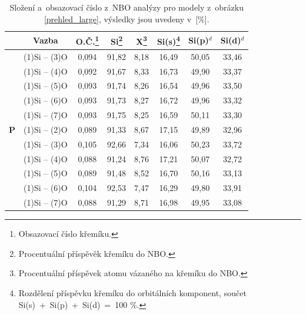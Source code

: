 \documentclass[
digital, %
table,   %
nolof,     %
nolot,     %
oneside,
]{fithesis3}
\begin{document}
\begin{table}[H]
\caption{Složení a~obsazovací číslo z~NBO analýzy pro modely z~obrázku \ref{prehled_large}, výsledky jsou uvedeny v~[\%].}
\begin{minipage}{\textwidth}
\begin{center}
\begin{tabular}{|l|c|c|c|c|c|c|c|}
\hline
\label{nbo_large}&  Vazba & O.Č.\footnote{Obsazovací číslo křemíku.} & Si\footnote{Procentuální příspěvěk křemíku do NBO.} & X\footnote{Procentuální příspěvek atomu vázaného na křemíku do NBO.} & Si(s)\footnote{Rozdělení příspěvku křemíku do orbitálních komponent, součet Si(s)~+~Si(p)~+~Si(d)~=~100 \%.} & Si(p)$^d$ &Si(d)$^d$ \\ \hline
& (1)Si -- (3)O  & 0,094 & 91,82   & 8,18   & 16,49   & 50,05   & 33,46   \\ \hline
&  (1)Si -- (4)O  & 0,092 & 91,67   & 8,33   & 16,73   & 49,90   & 33,37   \\ \hline
& (1)Si -- (5)O & 0,093 & 91,74   & 8,26   & 16,54   & 49,96   & 33,50   \\ \hline
&  (1)Si -- (6)O & 0,093 & 91,73   & 8,27   & 16,72   & 49,96   & 33,32   \\ \hline
& (1)Si -- (7)O& 0,093 & 91,75   & 8,25   & 16,59   & 50,11   & 33,30   \\ \hline
\textbf{P}& (1)Si -- (2)O  & 0,089 & 91,33   & 8,67   & 17,15   & 49,89   & 32,96   \\ \hline
&  (1)Si -- (3)O  & 0,105 & 92,66   & 7,34   & 16,06   & 50,23   & 33,72   \\ \hline
&  (1)Si -- (4)O   & 0,088 & 91,24   & 8,76   & 17,21   & 50,07   & 32,72   \\ \hline
& (1)Si -- (5)O  & 0,089 & 91,48   & 8,52   & 16,70   & 50,16   & 33,13   \\ \hline
&  (1)Si -- (6)O & 0,104 & 92,53   & 7,47   & 16,29   & 49,80   & 33,91   \\ \hline
&  (1)Si -- (7)O & 0,088 & 91,29   & 8,71   & 16,98   & 49,95   & 33,08   \\ \hline
\end{tabular}\end{center}\end{minipage}\end{table}
\end{document}
